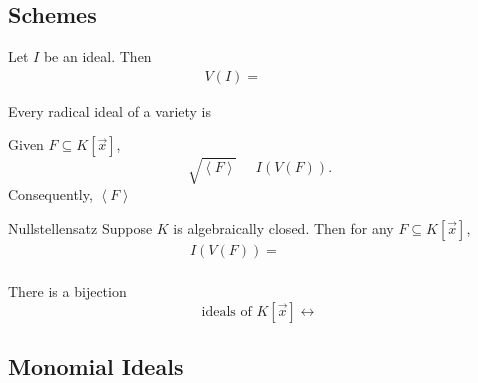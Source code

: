 \documentclass[11pt]{article}
\begin{document}
    \subsection{Schemes}

    \begin{lemma}{}
        Let $I$ be an ideal. Then
        \begin{equation*}
            V\left( I \right) = \phantom{V\left( \sqrt{I} \right)}
        \end{equation*}
    \end{lemma}

    \rruleline
    
    \begin{lemma}{}
        Every radical ideal of a variety is 
    \end{lemma}

    \rruleline

    \begin{lemma}{}
        Given $F\subseteq K\left[ \vec{x} \right]$,
        \begin{equation*}
            \sqrt{\left< F \right> } \phantom{\subseteq} I\left( V\left( F \right) \right).
        \end{equation*}
        Consequently, $\left< F \right>$
    \end{lemma}

    \rruleline

    \begin{theorem}{Nullstellensatz}
        Suppose $K$ is algebraically closed. Then for any $F\subseteq K\left[ \vec{x} \right]$, 
        \begin{equation*}
            I\left( V\left( F \right) \right) = \phantom{\sqrt{\left< F \right> }}
        \end{equation*}
    \end{theorem}

    \rruleline

    \begin{theorem}{}
        There is a bijection
        \begin{equation*}
            \text{ideals of $K\left[ \vec{x} \right]$} \leftrightarrow
        \end{equation*}
    \end{theorem}

    \rruleline
    
    \subsection{Monomial Ideals}
    
\end{document}
